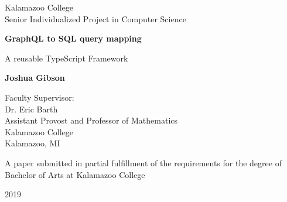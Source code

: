 \documentclass[12pt]{article}
\begin{document}
\begin{titlepage}
   \begin{center}
        Kalamazoo College\\
        Senior Individualized Project in Computer Science
       \vspace*{3cm}
 
       \textbf{GraphQL to SQL query mapping}
 
       \vspace{0.5cm}
        A reusable TypeScript Framework
 
       \vspace{1.5cm}
 
       \textbf{Joshua Gibson}
 
       \vspace{4cm}
 
       Faculty Supervisor:\\
       Dr. Eric Barth\\
       Assistant Provost and Professor of Mathematics\\
       Kalamazoo College\\
       Kalamazoo, MI
       
       \vspace{3cm}
       
       A paper submitted in partial fulfillment of the requirements for the degree of Bachelor of Arts at Kalamazoo College
       
       \vspace{2cm}
       2019
 
   \end{center}
\end{titlepage}


\null \newpage

\setcounter{page}{2}

\tableofcontents
\newpage

\listoffigures
\newpage

\doublespacing





















\newpage
\setcounter{page}{1}
\printbibliography
%
%
\end{document}
